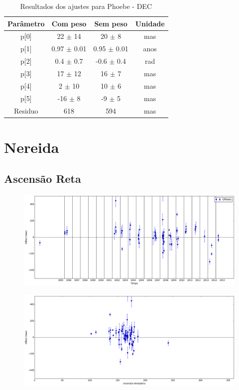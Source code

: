 \documentclass[11pt,a4paper]{report}
\begin{document}
\begin{table}[h!]
\caption{\label{Tab: Phoebe-DEC} Resultados dos ajustes para Phoebe - DEC}
\begin{centering}
\begin{tabular}{cccc}
\hline
\hline
Parâmetro & Com peso & Sem peso & Unidade\tabularnewline
\hline
p[0] & 22 $\pm$ 14 & 20 $\pm$ 8 & mas\\
p[1] & 0.97 $\pm$ 0.01 & 0.95 $\pm$ 0.01 & anos\\
p[2] & 0.4 $\pm$ 0.7 & -0.6 $\pm$ 0.4 & rad\\
p[3] & 17 $\pm$ 12 & 16 $\pm$ 7 & mas\\
p[4] & 2 $\pm$ 10 & 10 $\pm$ 6 & mas\\
p[5] & -16 $\pm$ 8 & -9 $\pm$ 5 & mas\\
Residuo & 618 & 594 & mas\\
\hline 
\end{tabular} 
\par\end{centering}
\end{table}

\chapter*{Nereida}
\section*{Ascensão Reta}

\begin{figure}[h]
\includegraphics[scale=0.35]{Nereida/RA.png} 
\end{figure}

\begin{figure}[h]
\includegraphics[scale=0.35]{Nereida/RA_anom.png}  
\end{figure}
\end{document}
